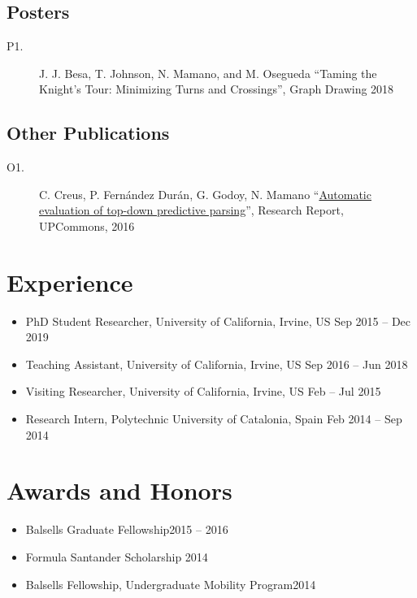 \documentclass[letterpaper,10pt,oneside]{article}
\begin{document}
\subsection*{Posters}
\begin{description}
	\item[P1.] J. J. Besa, T. Johnson, N. Mamano, and M. Osegueda ``Taming the Knight’s Tour: Minimizing Turns and Crossings'', Graph Drawing 2018
\end{description}
\subsection*{Other Publications }
\begin{description}
	\item[O1.] C. Creus, P. Fernández Durán, G. Godoy, N. Mamano
	 ``\href{https://upcommons.upc.edu/bitstream/handle/2117/119781/Automatic\%20evaluation\%20of\%20top-down\%20predictive\%20parsing.pdf?sequence=1\&isAllowed=y}{Automatic evaluation of top-down predictive parsing}'', Research Report, UPCommons, 2016
\end{description}

\section*{Experience}
\begin{itemize}
	\item PhD Student Researcher, University of California, Irvine, US \hfill Sep 2015 -- Dec 2019
	\item Teaching Assistant, University of California, Irvine, US \hfill Sep 2016 -- Jun 2018
	\item Visiting Researcher, University of California, Irvine, US \hfill Feb -- Jul 2015
    \item Research Intern, Polytechnic University of Catalonia, Spain \hfill Feb 2014 -- Sep 2014
\end{itemize}

\section*{Awards and Honors}
\begin{itemize}
	\item Balsells Graduate Fellowship\hfill 2015 -- 2016
	\item Formula Santander Scholarship \hfill 2014
	\item Balsells Fellowship, Undergraduate Mobility Program\hfill 2014
\end{itemize}
\end{document}
